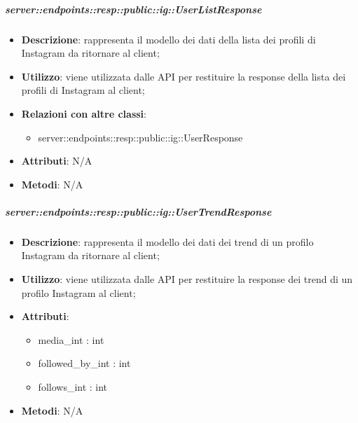     \subparagraph{server::endpoints::resp::public::ig::UserListResponse} %
    \label{subp:bdsm_app_server_endpoints_resp_public_ig_userlistresponse}
    \begin{itemize}
      \item \textbf{Descrizione}: rappresenta il modello dei dati della lista dei profili di Instagram da ritornare al client;
      \item \textbf{Utilizzo}: viene utilizzata dalle API per restituire la response della lista dei profili di Instagram al client;
      \item \textbf{Relazioni con altre classi}:
        \begin{itemize}
          \item server::endpoints::resp::public::ig::UserResponse
        \end{itemize}
	  \item \textbf{Attributi}: N/A
	  \item \textbf{Metodi}: N/A
      \end{itemize}

    \subparagraph{server::endpoints::resp::public::ig::UserTrendResponse} %
    \label{subp:bdsm_app_server_endpoints_resp_public_ig_usertrendresponse}
    \begin{itemize}
      \item \textbf{Descrizione}: rappresenta il modello dei dati dei trend di un profilo Instagram da ritornare al client;
      \item \textbf{Utilizzo}: viene utilizzata dalle API per restituire la response dei trend di un profilo Instagram al client;
      
	  \item \textbf{Attributi}:  
	  	\begin{itemize}
	  		\item media\_int : int
	  		\item followed\_by\_int : int
	  		\item follows\_int : int
	  	\end{itemize}
	  \item \textbf{Metodi}: N/A
      \end{itemize}


